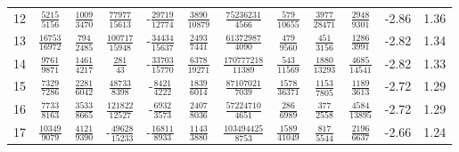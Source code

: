 \begin{sidewaystable}
\begin{tabular}{r|ccccccccc|c@{ -- }c@{\%}}
12
&  $\frac{            5215}{            5156}$
&  $\frac{            1009}{            3470}$
&  $\frac{           77977}{           15613}$
& -$\frac{           29719}{           12774}$
&  $\frac{            3890}{           10879}$
&  $\frac{        75236231}{            4566}$
&  $\frac{             579}{           10655}$
&  $\frac{            3977}{           28471}$
&  $\frac{            2948}{            9301}$
&  -2.86 &  1.36
\\
13
&  $\frac{           16753}{           16972}$
&  $\frac{             794}{            2485}$
&  $\frac{          100717}{           15948}$
& -$\frac{           34434}{           15637}$
&  $\frac{            2493}{            7441}$
&  $\frac{        61372987}{            4090}$
&  $\frac{             479}{            9560}$
&  $\frac{             451}{            3156}$
&  $\frac{            1286}{            3991}$
&  -2.82 &  1.34
\\
14
&  $\frac{            9761}{            9871}$
&  $\frac{            1461}{            4217}$
&  $\frac{             281}{              43}$
& -$\frac{           33703}{           15770}$
&  $\frac{            6378}{           19271}$
&  $\frac{       170777218}{           11389}$
&  $\frac{             543}{           11569}$
&  $\frac{            1880}{           13293}$
&  $\frac{            4685}{           14541}$
&  -2.82 &  1.33
\\
15
&  $\frac{            7329}{            7286}$
&  $\frac{            2281}{            6042}$
&  $\frac{           48733}{            8398}$
& -$\frac{            8421}{            4222}$
&  $\frac{            1839}{            6014}$
&  $\frac{        87107021}{            7039}$
&  $\frac{            1578}{           36371}$
&  $\frac{            1153}{            7805}$
&  $\frac{            1189}{            3613}$
&  -2.72 &  1.29
\\
16
&  $\frac{            7733}{            8163}$
&  $\frac{            3533}{            8665}$
&  $\frac{          121822}{           12527}$
& -$\frac{            6932}{            3573}$
&  $\frac{            2407}{            8036}$
&  $\frac{        57224710}{            4651}$
&  $\frac{             286}{            6989}$
&  $\frac{             377}{            2558}$
&  $\frac{            4584}{           13895}$
&  -2.72 &  1.29
\\
17
&  $\frac{           10349}{            9079}$
&  $\frac{            4121}{            9390}$
& -$\frac{           49628}{           15233}$
& -$\frac{           16811}{            8933}$
&  $\frac{            1143}{            3880}$
&  $\frac{       103494425}{            8753}$
&  $\frac{            1589}{           41049}$
&  $\frac{             817}{            5544}$
&  $\frac{            2196}{            6637}$
&  -2.66 &  1.24
\end{tabular}
\end{sidewaystable}

